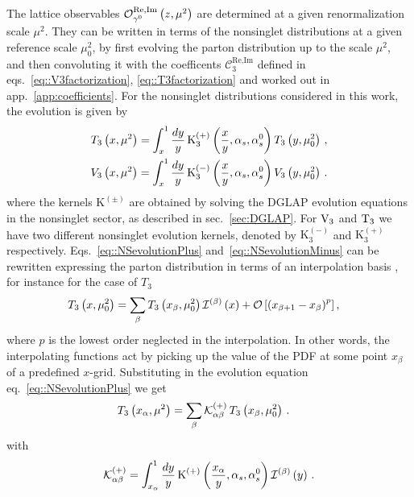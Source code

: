 %
The lattice observables $\mathcal{O}_{\gamma^0}^{\text{Re},\text{Im}}\left( z,
\mu^2 \right)$ are determined at a given renormalization scale $\mu^2$. They can be
written in terms of the nonsinglet distributions at a given reference scale
$\mu_0^2$, by first evolving the parton distribution up to the scale $\mu^2$,
and then convoluting it with the coefficents
$\mathcal{C}_3^{\text{Re},\text{Im}}$ defined in
eqs.~\eqref{eq::V3factorization}, \eqref{eq::T3factorization} and worked out in
app.~\ref{app:coefficients}. For the nonsinglet distributions considered in this work, the evolution is given by
\begin{align}
	\label{eq::NSevolutionPlus}
	T_3 \left( x, \mu^2 \right) = \int_x^1 \frac{dy}{y}\, 
	\text{K}_3^{(+)}\left( \frac{x}{y}, \alpha_s, \alpha_s^0 \right) T_3 \left( y, \mu_0^2 \right)\, , \\
	\label{eq::NSevolutionMinus}
	V_3 \left( x, \mu^2 \right) = \int_x^1 \frac{dy}{y}\, 
	\text{K}_3^{(-)}\left( \frac{x}{y}, \alpha_s, \alpha_s^0 \right) V_3 \left( y, \mu_0^2 \right)\, .
\end{align}
where the kernels $\text{K}^{(\pm)}$ are obtained by solving the DGLAP evolution
equations in the nonsinglet sector, as described in sec.~\ref{sec:DGLAP}.
For $\mathrm{V}_3$ and $\mathrm{T}_3$ we have two different
nonsinglet evolution kernels, denoted by $\text{K}_3^{(-)}$ and
$\text{K}_3^{(+)}$ respectively. Eqs.~\eqref{eq::NSevolutionPlus}
and~\eqref{eq::NSevolutionMinus} can be rewritten expressing the parton
distribution in terms of an interpolation basis \cite{Ball:2010de}, for instance for the case of
$T_3$
\begin{align}
	  & T_3\left( x, \mu_0^2 \right) = \sum_{\beta}T_3\left( x_{\beta}, \mu_0^2\right)\mathcal{I}^{(\beta)}\left( x \right) 
          + \mathcal{O}\left[\left(x_{\beta+1}-x_{\beta}\right)^p\right], 
\end{align}  
where $p$ is the lowest order neglected in the interpolation.
In other words, the interpolating functions
act by picking up the value of the PDF at some point $x_{\beta}$ of a
predefined $x$-grid. Substituting in the evolution equation
eq.~\eqref{eq::NSevolutionPlus} we get
\begin{align}
	\label{eq::fastevol}
	T_3 \left( x_{\alpha}, \mu^2 \right) & = 
	\sum_{\beta} \mathcal{K}^{(+)}_{\alpha\beta}\,
	T_3 \left( x_{\beta}, \mu_0^2 \right)\, . 
\end{align}
with
\begin{align}
	\mathcal{K}^{(+)}_{\alpha\beta} = \int_{x_{\alpha}}^1 \frac{dy}{y}\, 
	\text{K}^{(+)} \left( \frac{x_{\alpha}}{y}, \alpha_s, \alpha_s^0 \right) 
	\mathcal{I}^{(\beta)}\left( y \right) \, .
\end{align}
